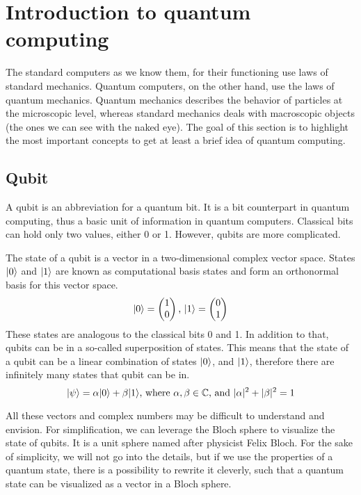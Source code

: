 \section{Introduction to quantum computing}
The standard computers as we know them, for their functioning use laws of standard mechanics. Quantum computers, on the other hand, use the laws of quantum mechanics. Quantum mechanics describes the behavior of particles at the microscopic level, whereas standard mechanics deals with macroscopic objects (the ones we can see with the naked eye). The goal of this section is to highlight the most important concepts to get at least a brief idea of quantum computing.
\subsection{Qubit}
A qubit is an abbreviation for a quantum bit. It is a bit counterpart in quantum computing, thus a basic unit of information in quantum computers. Classical bits can hold only two values, either 0 or 1. However, qubits are more complicated.

The state of a qubit is a vector in a two-dimensional complex vector space. States $\lvert0\rangle$ and $\lvert1\rangle$ are known as computational basis states and form an orthonormal basis for this vector space. \cite{qc} 
$$\lvert0\rangle = \begin{pmatrix} 1 \\ 0 \end{pmatrix}\text{, }\lvert1\rangle = \begin{pmatrix} 0 \\ 1 \end{pmatrix}$$
These states are analogous to the classical bits 0 and 1. In addition to that, qubits can be in a so-called superposition of states. This means that the state of a qubit can be a linear combination of states $\lvert0\rangle$, and $\lvert1\rangle$, therefore there are infinitely many states that qubit can be in. $$\lvert\psi\rangle = \alpha \lvert0\rangle + 
\beta \lvert1\rangle\text{, where } \alpha,\beta \in \mathbb{C}\text{, and } \lvert \alpha \rvert^2 + \lvert \beta \rvert^2 = 1$$

All these vectors and complex numbers may be difficult to understand and envision. For simplification, we can leverage the Bloch sphere to visualize the state of qubits. It is a unit sphere named after physicist Felix Bloch. For the sake of simplicity, we will not go into the details, but if we use the properties of a quantum state, there is a possibility to rewrite it cleverly, such that a quantum state can be visualized as a vector in a Bloch sphere.

